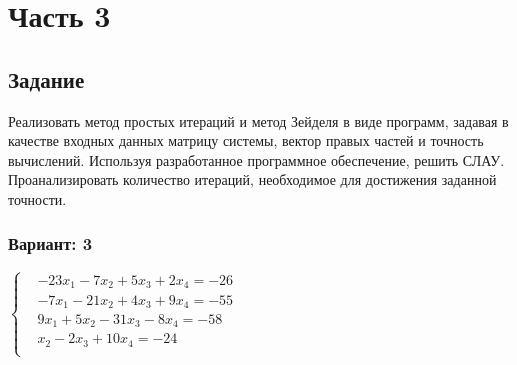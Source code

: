 
\chapter*{Часть 3}

\section*{Задание}
Реализовать метод простых итераций и метод Зейделя в виде программ, задавая в качестве
входных данных матрицу системы, вектор правых частей и точность вычислений. Используя
разработанное программное обеспечение, решить СЛАУ. Проанализировать количество
итераций, необходимое для достижения заданной точности.

\subsection*{Вариант: 3}


$\left\{\begin{aligned}
    & -23x_1 - 7x_2 + 5x_3 + 2x_4 = -26 \\
    & -7x_1 - 21x_2 + 4x_3 + 9x_4 = -55 \\
    & 9x_1 + 5x_2 - 31x_3 - 8x_4 = -58 \\
    & x_2 - 2x_3 + 10x_4 = -24 \\
\end{aligned}\right.$

\pagebreak